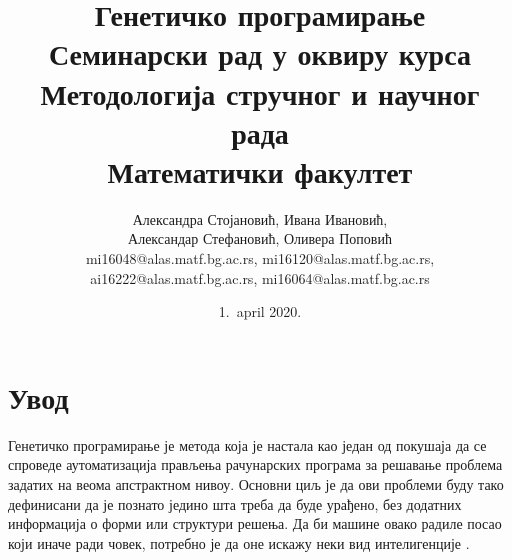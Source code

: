 \documentclass[a4paper]{article}
\begin{document}
\title{Генетичко програмирање\\ \small{Семинарски рад у оквиру курса\\Методологија стручног и научног рада\\ Математички факултет}}

\author{Александра Стојановић, Ивана Ивановић,\\ Александар Стефановић, Оливера Поповић\\ mi16048@alas.matf.bg.ac.rs, mi16120@alas.matf.bg.ac.rs,\\ ai16222@alas.matf.bg.ac.rs, mi16064@alas.matf.bg.ac.rs}

\date{1.~april 2020.}

\maketitle


\tableofcontents

\newpage

\section{Увод}

Генетичко програмирање је метода која је настала као један од покушаја да се спроведе аутоматизација прављења рачунарских програма за решавање проблема задатих на веома апстрактном нивоу. Основни циљ је да ови проблеми буду тако дефинисани да је познато једино шта треба да буде урађено, без додатних информација о форми или структури решења. Да би машине овако радиле посао који иначе ради човек, потребно је да оне искажу неки вид интелигенције \cite{turing}.
\end{document}
